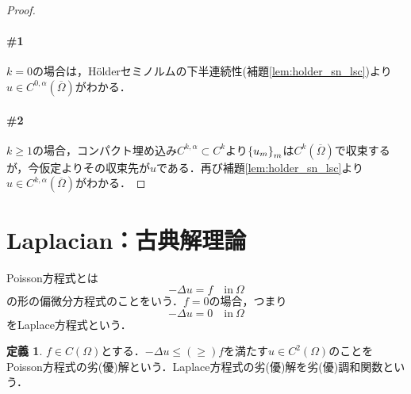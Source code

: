 \documentclass[a4paper]{ltjsarticle}
\newcommand{\Om}{\Omega}
\newcommand{\Ombar}{\overline{\Omega}}
\newcommand{\inn}{\quad\text{in}\ }
\newcommand{\1}{\mathbbm{1}}
\numberwithin{equation}{section}
\theoremstyle{definition}
\newtheorem{dfn}[thm]{定義}
\begin{document}
\begin{proof}
    \paragraph*{\#1}$k=0$の場合は，Hölderセミノルムの下半連続性(補題\ref{lem:holder_sn_lsc})より$u\in C^{0,\alpha}(\Ombar)$がわかる．

    \paragraph*{\#2}$k\geq1$の場合，コンパクト埋め込み$C^{k,\alpha}\subset C^k$より$\qty{u_m}_m$は$C^k(\Ombar)$で収束するが，今仮定よりその収束先が$u$である．再び補題\ref{lem:holder_sn_lsc}より$u\in C^{k,\alpha}(\Ombar)$がわかる．
\end{proof}
\section{Laplacian：古典解理論}
Poisson方程式とは
\begin{equation}
    -\Delta u=f \inn \Om
\end{equation}
の形の偏微分方程式のことをいう．$f=0$の場合，つまり
\begin{equation}
    -\Delta u = 0 \inn \Om
\end{equation}
をLaplace方程式という．
\begin{dfn}\label{dfn:sub/super_sol}
    $f\in C(\Omega)$とする．$-\Delta u\leq (\geq)f$を満たす$u\in C^2(\Om)$のことをPoisson方程式の劣(優)解という．Laplace方程式の劣(優)解を劣(優)調和関数という．
\end{dfn}
\end{document}
